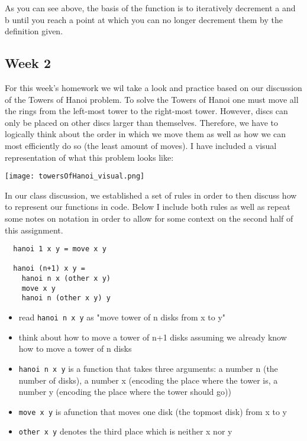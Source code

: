 \documentclass{article}
\theoremstyle{theorem}
\theoremstyle{definition}
\theoremstyle{remark}
\begin{document}
As you can see above, the basis of the function is to iteratively decrement a and b until you reach a point at which you can no longer
decrement them by the definition given. 

\subsection{Week 2}
For this week's homework we wil take a look and practice based on our discussion of the Towers of Hanoi problem. To solve the Towers of Hanoi one must move all the rings
from the left-most tower to the right-most tower. However, discs can only be placed on other discs larger than themselves. Therefore, we have to logically think about the 
order in which we move them as well as how we can most efficiently do so (the least amount of moves). I have included a visual representation of what this problem looks like: 
\begin{center}
  \texttt{[image: towersOfHanoi\_visual.png]}
\end{center}

In our class discussion, we established a set of rules in order to then discuss how to represent our functions in code. Below I include both rules as well as repeat some notes on notation 
in order to allow for some context on the second half of this assignment.
\begin{verbatim}
  hanoi 1 x y = move x y 

  hanoi (n+1) x y = 
    hanoi n x (other x y)
    move x y 
    hanoi n (other x y) y
\end{verbatim}
\begin{itemize}
  \item read \texttt{hanoi n x y} as "move tower of n disks from x to y"
  \item think about how to move a tower of n+1 disks assuming we already know how to move a tower of n disks 
  \item \texttt{hanoi n x y} is a function that takes three arguments: a number n (the number of disks), a number x (encoding the place where the tower is, a number y (encoding the place
  where the tower should go))
  \item \texttt{move x y} is afunction that moves one disk (the topmost disk) from x to y 
  \item \texttt{other x y} denotes the third place which is neither x nor y 
\end{itemize}
\end{document}
